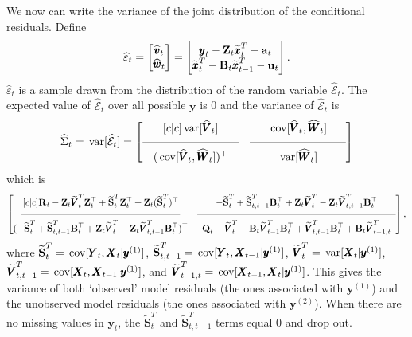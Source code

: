 \documentclass[]{article}
\def\UPS{\mbox{\boldmath $\Upsilon$}}
\def\XI{\mbox{\boldmath $\Xi$}}
\def\BB{\mbox{$\mathbf B$}}	\def\bb{\mbox{$\mathbf b$}} \def\Bb{\mbox{$\mathbf J$}} \def\Ba{\mbox{$\mathbf L$}} \def\Bm{\UPS}
\def\QQ{\mbox{$\mathbf Q$}}	 \def\qq{\mbox{$\mathbf q$}} \def\Qb{\mbox{$\mathbf G$}}  \def\Qm{\mathbb{Q}}
\def\RR{\mbox{$\mathbf R$}}	 \def\rr{\mbox{$\mathbf r$}} \def\Rb{\mbox{$\mathbf H$}}	\def\Rm{\mathbb{R}}
\def\Ss{\mbox{$\mathbf S$}}
\def\VV{\mbox{$\pmb{V}$}}	\def\vv{\mbox{$\pmb{v}$}}
\def\WW{\mbox{$\pmb{W}$}}	\def\ww{\mbox{$\pmb{w}$}}
\def\XX{\mbox{$\pmb{X}$}}	\def\xx{\mbox{$\pmb{x}$}}
\def\YY{\mbox{$\pmb{Y}$}}	\def\yy{\mbox{$\pmb{y}$}}
\def\ZZ{\mbox{$\mathbf Z$}}	\def\zz{\mbox{$\mathbf z$}}	\def\Zb{\mbox{$\mathbf M$}} \def\Za{\mbox{$\mathbf N$}} \def\Zm{\XI}
\def\var{\,\textup{\textrm{var}}}
\def\cov{\,\textup{\textrm{cov}}}
\def\hatxtT{\widetilde{\xx}_t^T}
\def\hatxtmT{\widetilde{\xx}_{t-1}^T}
\def\hatWt{\widehat{\WW}_t}
\def\hatwt{\widehat{\ww}_t}
\def\hatVt{\widehat{\VV}_t}
\def\hatvt{\widehat{\vv}_t}
\def\hatVtT{\widetilde{\VV}_t^T}
\def\hatVtmT{\widetilde{\VV}_{t-1}^T}
\def\hatVttmT{\widetilde{\VV}_{t,t-1}^T}
\def\hatVtmtT{\widetilde{\VV}_{t-1,t}^T}
\def\hatStT{\widetilde{\Ss}_t^T}
\def\hatSttmT{\widetilde{\Ss}_{t,t-1}^T}
\begin{document}
We now can write the variance of the joint distribution of the conditional residuals. Define
\begin{equation}
\widehat{\varepsilon}_t = \begin{bmatrix}\hatvt\\ \hatwt\end{bmatrix} =
\begin{bmatrix}\yy_t - \ZZ_t\hatxtT - \aa_t\\ \hatxtT - \BB_t\hatxtmT - \uu_t \end{bmatrix}.
\end{equation}
$\widehat{\varepsilon}_t$ is a sample drawn from the distribution of the random variable $\widehat{\mathcal{E}}_t$.  The expected value of $\widehat{\mathcal{E}}_t$ over all possible $\yy$ is 0 and the variance of $\widehat{\mathcal{E}}_t$  is
\begin{equation}
\widehat{\Sigma}_t = \var[\widehat{\mathcal{E}}_t] = \begin{bmatrix}[c|c]
 \var[\hatVt]&
 \cov[\hatVt, \hatWt] \\
 \rule[.5ex]{20ex}{0.25pt} & \rule[.5ex]{20ex}{0.25pt} \\
 (\cov[\hatVt, \hatWt])^\top& 
 \var[\hatWt] \end{bmatrix}
\end{equation}
which is
\begin{equation}\label{eq:jointcondresid1general}
 \begin{bmatrix}[c|c]
 \RR_t - \ZZ_t\hatVtT\ZZ_t^\top + \hatStT\ZZ_t^\top+\ZZ_t(\hatStT)^\top&
 - \hatStT + \hatSttmT\BB_t^\top + \ZZ_t\hatVtT - \ZZ_t\hatVttmT\BB_t^\top\\
 \rule[.5ex]{40ex}{0.25pt} & \rule[.5ex]{50ex}{0.25pt} \\
 (- \hatStT + \hatSttmT\BB_t^\top + \ZZ_t\hatVtT  - \ZZ_t\hatVttmT\BB_t^\top)^\top& 
 \QQ_t - \hatVtT - \BB_t\hatVtmT\BB_t^\top + \hatVttmT\BB_t^\top + \BB_t\hatVtmtT \end{bmatrix},
\end{equation}
where $\hatStT=\cov[\YY_t,\XX_t|\yy^{(1)}]$, $\hatSttmT=\cov[\YY_t,\XX_{t-1}|\yy^{(1)}]$, $\hatVtT=\var[\XX_t|\yy^{(1)}]$, $\hatVttmT=\cov[\XX_t,\XX_{t-1}|\yy^{(1)}]$, and $\hatVtmtT=\cov[\XX_{t-1},\XX_t|\yy^{(1)}]$. This gives the variance of both `observed' model residuals (the ones associated with $\yy^{(1)}$) and the unobserved model residuals (the ones associated with $\yy^{(2)}$).  
When there are no missing values in $\yy_t$, the $\hatStT$ and $\hatSttmT$ terms equal 0 and drop out.
\end{document}
